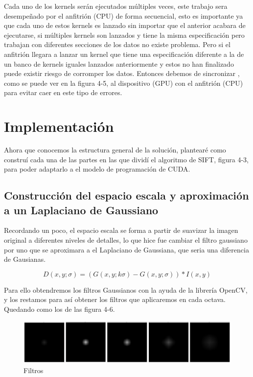 Cada uno de los kernels serán ejecutados múltiples veces, este trabajo sera desempeñado por el anfitrión (CPU) de forma secuencial, esto es importante ya que cada uno de estos kernels es lanzado sin importar que el anterior acabara de ejecutarse, si múltiples kernels son lanzados y tiene la misma especificación pero trabajan con diferentes secciones de los datos no existe problema. Pero si el anfitrión llegara a lanzar un kernel que tiene una especificación diferente a la de un banco de kernels iguales lanzados anteriormente y estos no han finalizado puede existir riesgo de corromper los datos. Entonces debemos de sincronizar , como se puede ver en la figura 4-5, al  dispositivo (GPU) con el anfitrión (CPU) para evitar caer en este tipo de errores.



\pagebreak
\section{Implementación}

Ahora que conocemos la estructura general de la solución, plantearé como construí cada una de las partes en las que dividí el algoritmo de SIFT, figura 4-3,  para poder adaptarlo a el modelo de programación de CUDA.

\subsection{Construcción del espacio escala y aproximación a un Laplaciano de Gaussiano}

Recordando un poco, el espacio escala se forma a partir de suavizar la imagen original a diferentes niveles de detalles, lo que hice fue cambiar el filtro gaussiano por uno que se aproximara a el Laplaciano de Gaussiana, que seria una diferencia de Gausianas. 

$$D(x,y;\sigma) = (G(x,y;k\sigma) - G(x,y;\sigma)) * I(x,y)$$ 

Para ello obtendremos los filtros Gaussianos con la ayuda de la librería OpenCV, y los restamos para así obtener los filtros que aplicaremos en cada octava. Quedando como los de las figura 4-6.


\begin{figure}[h]
			\centering
				\includegraphics[scale=0.2]{img/DoG.jpg}
			\caption{Filtros}
\end{figure}



